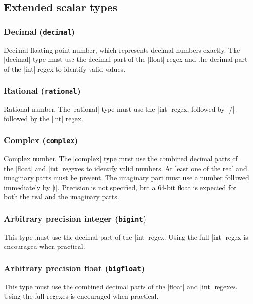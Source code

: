 \documentclass[11pt]{article}
\begin{document}
\subsection{Extended scalar types}

\subsubsection{Decimal (\texttt{decimal})}

Decimal floating point number, which represents decimal numbers exactly.  The |decimal| type must use the decimal part of the |float| regex and the decimal part of the |int| regex to identify valid values.


\subsubsection{Rational (\texttt{rational})}

Rational number.  The |rational| type must use the |int| regex, followed by |/|,  followed by the |int| regex.


\subsubsection{Complex (\texttt{complex})}

Complex number.  The |complex| type must use the combined decimal parts of the |float| and |int| regexes to identify valid numbers.  At least one of the real and imaginary parts must be present.  The imaginary part must use a number followed immediately by |i|.  Precision is not specified, but a 64-bit float is expected for both the real and the imaginary parts.


\subsubsection{Arbitrary precision integer (\texttt{bigint})}

This type must use the decimal part of the |int| regex.  Using the full |int| regex is encouraged when practical.


\subsubsection{Arbitrary precision float (\texttt{bigfloat})}

This type must use the combined decimal parts of the |float| and |int| regexes.  Using the full regexes is encouraged when practical.
\end{document}
